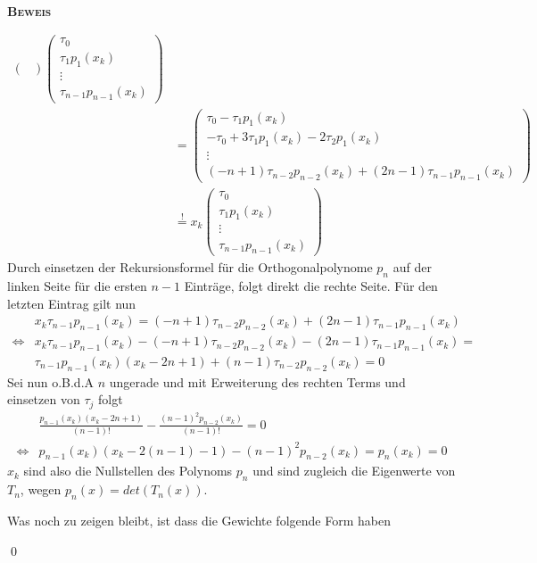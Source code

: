 \documentclass[12pt,a4paper]{scrartcl}
\numberwithin{equation}{section}
\numberwithin{myalgctr}{section}
\numberwithin{mytheoremctr}{subsection}
\numberwithin{mykorollarctr}{subsection}
\numberwithin{mylemmactr}{subsection}
\numberwithin{mybeispielctr}{subsection}
\newenvironment{myproof}{%
	\bigskip\noindent%
	\textsc{\textbf{\\Beweis\\}}%
	\indent
}{\qed\par\bigskip}  %
\begin{document}
\begin{myproof}
\begin{itemize}
\begin{align*}
\begin{pmatrix}
				\end{pmatrix}
				\begin{pmatrix}
					\tau_0 \\ \tau_1p_1(x_k) \\ \vdots \\ \tau_{n-1}p_{n-1}(x_k)
				\end{pmatrix} \\
				& = 
				\begin{pmatrix}
				\tau_0 -\tau_1p_1(x_k)  \\ -\tau_0 + 3\tau_1p_1(x_k) - 2\tau_2p_1(x_k)\\ \vdots \\ (-n+1)\tau_{n-2}p_{n-2}(x_k) + (2n-1)\tau_{n-1}p_{n-1}(x_k) 
				\end{pmatrix} \\
				& \stackrel{!}{=}
				x_k	
				\begin{pmatrix}
				\tau_0 \\ \tau_1p_1(x_k) \\ \vdots \\ \tau_{n-1}p_{n-1}(x_k)
				\end{pmatrix}
			\end{align*}
			Durch einsetzen der Rekursionsformel für die Orthogonalpolynome $p_n$ auf der linken Seite für die ersten $n-1$ Einträge, folgt direkt die rechte Seite. Für den letzten Eintrag gilt nun
			\begin{align*}
				&x_k\tau_{n-1}p_{n-1}(x_k) = (-n+1)\tau_{n-2}p_{n-2}(x_k) + (2n-1)\tau_{n-1}p_{n-1}(x_k) \\
				\Leftrightarrow &  x_k\tau_{n-1}p_{n-1}(x_k) - (-n+1)\tau_{n-2}p_{n-2}(x_k) - (2n-1)\tau_{n-1}p_{n-1}(x_k) = \\
				& \tau_{n-1}p_{n-1}(x_k)(x_k-2n+1) + (n-1)\tau_{n-2}p_{n-2}(x_k) = 0
			\end{align*} 
			Sei nun o.B.d.A $n$ ungerade und mit Erweiterung des rechten Terms und einsetzen von $\tau_j$ folgt
			\begin{align*}
				&\frac{p_{n-1}(x_k)(x_k-2n+1)}{(n-1)!} - \frac{(n-1)^2p_{n-2}(x_k)}{(n-1)!} = 0 \\
				\Leftrightarrow & p_{n-1}(x_k)(x_k-2(n-1)-1) - (n-1)^2p_{n-2}(x_k) = p_n(x_k) = 0
			\end{align*}
			$x_k$ sind also die Nullstellen des Polynoms $p_n$ und sind zugleich die Eigenwerte von $T_n$, wegen $p_n(x) = det(T_n(x))$. \autocite[vgl. Bsp. 40]{ubung}
		\end{itemize}
		Was noch zu  zeigen bleibt, ist dass die Gewichte folgende Form haben

\end{myproof}
\end{document}

